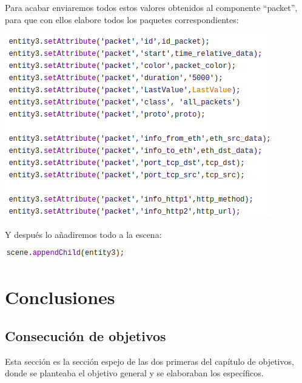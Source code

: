 \documentclass[a4paper, 12pt]{book}
\begin{document}
Para acabar enviaremos todos estos valores obtenidos al componente “packet”, para que con ellos elabore todos los paquetes correspondientes:

\begin{center}
    \includegraphics[scale=0.7]{img/atribPAckt_comp_netsim.png}
\end{center}

Y después lo añadiremos todo a la escena:

\begin{center}
    \includegraphics[scale=0.7]{img/escenaPack_comp_netsim.png}
\end{center}
    


\cleardoublepage
\chapter{Conclusiones}
\label{chap:conclusiones}

\section{Consecución de objetivos}
\label{sec:consecucion-objetivos}

Esta sección es la sección espejo de las dos primeras del capítulo de objetivos, donde se planteaba el objetivo general y se elaboraban los específicos.
\end{document}
